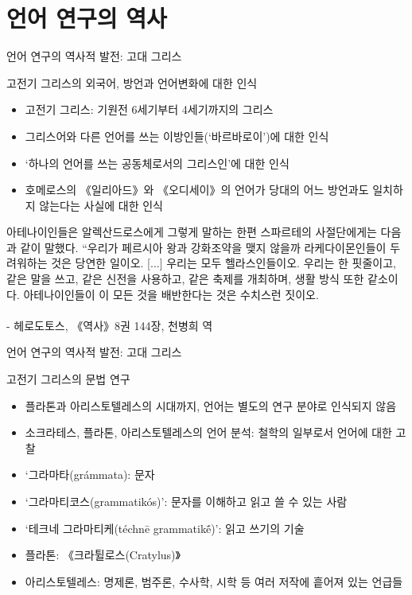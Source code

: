 \documentclass[11pt, aspectratio=169]{beamer}
\newcommand{\texttnr}[1]{{\tnrfont #1}}
\begin{document}
\section{언어 연구의 역사}

\begin{frame}[t]{언어 연구의 역사적 발전: 고대 그리스}
  \begin{block}{고전기 그리스의 외국어, 방언과 언어변화에 대한 인식}
      \begin{itemize}
        \item 고전기 그리스: 기원전 6세기부터 4세기까지의 그리스
        \item 그리스어와 다른 언어를 쓰는 이방인들(‘바르바로이’)에 대한 인식
        \item ‘하나의 언어를 쓰는 공동체로서의 그리스인’에 대한 인식 
        \item 호메로스의 《일리아드》와 《오디세이》의 언어가 당대의 어느 방언과도 일치하지 않는다는 사실에 대한 인식
      \end{itemize}
  \end{block}
  아테나이인들은 알렉산드로스에게 그렇게 말하는 한편 스파르테의 사절단에게는 다음과 같이 말했다. “우리가 페르시아 왕과 강화조약을 맺지 않을까 라케다이몬인들이 두려워하는 것은 당연한 일이오. [...] 우리는 모두 헬라스인들이오. 우리는 한 핏줄이고, 같은 말을 쓰고, 같은 신전을 사용하고, 같은 축제를 개최하며, 생활 방식 또한 같소이다. 아테나이인들이 이 모든 것을 배반한다는 것은 수치스런 짓이오. \\\\- 헤로도토스, 《역사》8권 144장, 천병희 역
\end{frame}

\begin{frame}[t]{언어 연구의 역사적 발전: 고대 그리스}
  \begin{block}{고전기 그리스의 문법 연구}
    \begin{itemize}
      \item 플라톤과 아리스토텔레스의 시대까지, 언어는 별도의 연구 분야로 인식되지 않음
      \item 소크라테스, 플라톤, 아리스토텔레스의 언어 분석: 철학의 일부로서 언어에 대한 고찰
    \end{itemize}
  \end{block}
  \begin{itemize}
    \item ‘그라마타(grámmata): 문자
    \item ‘그라마티코스(grammatikós)’: 문자를 이해하고 읽고 쓸 수 있는 사람
    \item ‘테크네 그라마티케(téchnē grammatik\texttnr{ḗ})’: 읽고 쓰기의 기술
  \end{itemize}
  \vfill
  \begin{itemize}
    \item 플라톤: 《크라튈로스(Cratylus)》
    \item 아리스토텔레스: 명제론, 범주론, 수사학, 시학 등 여러 저작에 흩어져 있는 언급들
  \end{itemize}
\end{frame}
\end{document}
